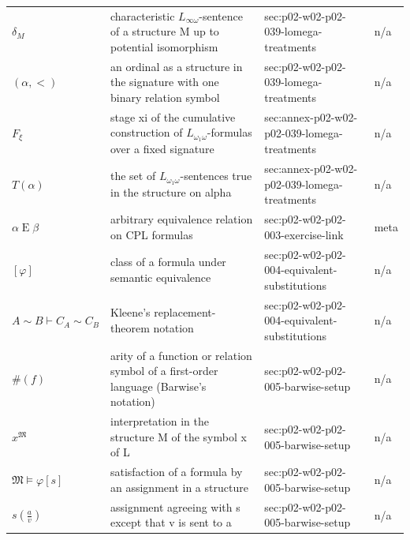 \begin{longtable}{@{}p{}p{}p{}p{}@{}}
\(\delta_M\) & characteristic \(L_{\infty\omega}\)-sentence of a structure M up to potential isomorphism & sec:\allowbreak{}p02-\allowbreak{}w02-\allowbreak{}p02-\allowbreak{}039-\allowbreak{}lomega-\allowbreak{}treatments & n/a \\
\((\alpha,\allowbreak <)\) & an ordinal as a structure in the signature with one binary relation symbol & sec:\allowbreak{}p02-\allowbreak{}w02-\allowbreak{}p02-\allowbreak{}039-\allowbreak{}lomega-\allowbreak{}treatments & n/a \\
\(F_\xi\) & stage xi of the cumulative construction of \(L_{\omega_1\omega}\)-formulas over a fixed signature & sec:\allowbreak{}annex-\allowbreak{}p02-\allowbreak{}w02-\allowbreak{}p02-\allowbreak{}039-\allowbreak{}lomega-\allowbreak{}treatments & n/a \\
\(T(\alpha)\) & the set of \(L_{\omega_1\omega}\)-sentences true in the structure on alpha & sec:\allowbreak{}annex-\allowbreak{}p02-\allowbreak{}w02-\allowbreak{}p02-\allowbreak{}039-\allowbreak{}lomega-\allowbreak{}treatments & n/a \\
\(\alpha\mathrel{E}\beta\) & arbitrary equivalence relation on CPL formulas & sec:\allowbreak{}p02-\allowbreak{}w02-\allowbreak{}p02-\allowbreak{}003-\allowbreak{}exercise-\allowbreak{}link & meta \\
\([\varphi]\) & class of a formula under semantic equivalence & sec:\allowbreak{}p02-\allowbreak{}w02-\allowbreak{}p02-\allowbreak{}004-\allowbreak{}equivalent-\allowbreak{}substitutions & n/a \\
\(A\sim B\vdash C_A\sim C_B\) & Kleene's replacement-theorem notation & sec:\allowbreak{}p02-\allowbreak{}w02-\allowbreak{}p02-\allowbreak{}004-\allowbreak{}equivalent-\allowbreak{}substitutions & n/a \\
\(\#(f)\) & arity of a function or relation symbol of a first-order language (Barwise's notation) & sec:\allowbreak{}p02-\allowbreak{}w02-\allowbreak{}p02-\allowbreak{}005-\allowbreak{}barwise-\allowbreak{}setup & n/a \\
\(x^{\mathfrak M}\) & interpretation in the structure M of the symbol x of L & sec:\allowbreak{}p02-\allowbreak{}w02-\allowbreak{}p02-\allowbreak{}005-\allowbreak{}barwise-\allowbreak{}setup & n/a \\
\(\mathfrak M\models\varphi[s]\) & satisfaction of a formula by an assignment in a structure & sec:\allowbreak{}p02-\allowbreak{}w02-\allowbreak{}p02-\allowbreak{}005-\allowbreak{}barwise-\allowbreak{}setup & n/a \\
\(s(\tfrac{a}{v})\) & assignment agreeing with s except that v is sent to a & sec:\allowbreak{}p02-\allowbreak{}w02-\allowbreak{}p02-\allowbreak{}005-\allowbreak{}barwise-\allowbreak{}setup & n/a \\

\end{longtable}
